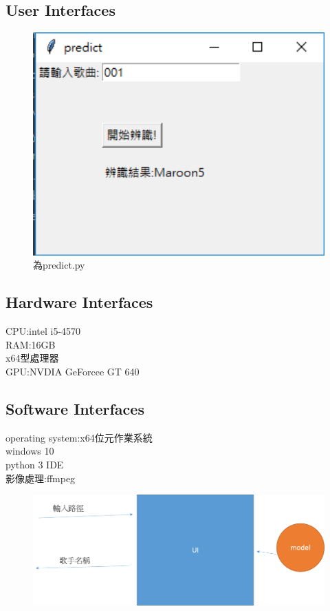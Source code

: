 \documentclass{article}
\begin{document}
\begin{CJK}{UTF8}{bkai}
\subsection{\Large User Interfaces\\}
\begin{figure}[h]
\begin{center}
\includegraphics[width=15cm]{ui.png}
\end{center}
\caption{為predict.py}
\label{fig:1}
\end{figure}
\subsection{\Large Hardware Interfaces\\}
CPU:intel i5-4570\\
RAM:16GB\\
x64型處理器\\
GPU:NVDIA GeForcee GT 640\\

\newpage
\subsection{\Large Software Interfaces\\}
operating system:x64位元作業系統 \\
 windows 10\\
python 3 IDE \\
影像處理:ffmpeg\\
\begin{figure}[h]
\begin{center}
\includegraphics[width=13cm]{UIN.png}
\end{center}
\label{fig:1}
\end{figure}
\newpage




\end{CJK}
\end{document}
